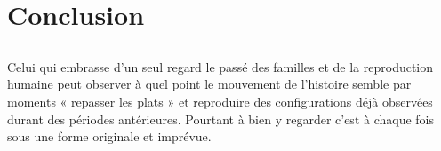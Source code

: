 
\part{Conclusion}

\chapter[Conclusion]{}


 Celui qui embrasse d'un seul regard le passé des familles et de la reproduction humaine peut observer à quel point le mouvement de l'histoire semble par moments « repasser les plats » et reproduire des configurations déjà observées durant des périodes antérieures. Pourtant à bien y regarder c'est à chaque fois sous une forme originale et imprévue.  
 
